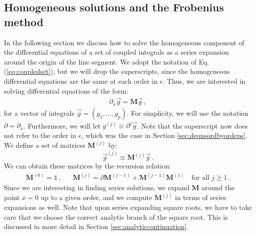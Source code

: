 \documentclass{article}
\begin{document}
\subsection{Homogeneous solutions and the Frobenius method}
\label{sec:homogeneoussolutions}
In the following section we discuss how to solve the homogeneous component of the differential equations of a set of coupled integrals as a series expansion around the origin of the line segment. We adopt the notation of Eq. (\ref{eq:coupledset}), but we will drop the superscripts, since the homogeneous differential equations are the same at each order in $\epsilon$. Thus, we are interested in solving differential equations of the form:
\begin{align}
    \label{eq:eqhom}
    \partial_x \vec{g} = \mathbf{M} \vec{g}\,,
\end{align}
for a vector of integrals $\vec{g} = (g_1,\ldots,g_p)$. For simplicity, we will use the notation $\partial = \partial_{x}$. Furthermore, we will let $g^{(j)} \equiv \partial^j \vec{g}$. Note that the superscript now does not refer to the order in $\epsilon$, which was the case in Section \ref{sec:deqnsordbyordeps}. We define a set of matrices $\mathbf{M}^{(j)}$ by:
\begin{equation}
    \label{eq:defAsups}
    \vec{g}^{(j)} \equiv \mathbf{M}^{(j)} \vec{g}\,.
\end{equation}
We can obtain these matrices by the recursion relation:
\begin{align}
\label{eq:Mmatrixrecursion}
\mathbf{M}^{(0)} = \mathbb{1}\,,&& \mathbf{M}^{(j)} = \partial \mathbf{M}^{(j-1)} + \mathbf{M}^{(j-1)} \mathbf{M}^{(1)}\quad\text{for all }j\geq 1\,.
\end{align}
Since we are interesting in finding series solutions, we expand $\mathbf{M}$ around the point $x=0$ up to a given order, and we compute $\mathbf{M}^{(j)}$ in terms of series expansions as well. Note that upon series expanding square roots, we have to take care that we choose the correct analytic branch of the square root. This is discussed in more detail in Section \ref{sec:analyticcontinuation}.
\end{document}
